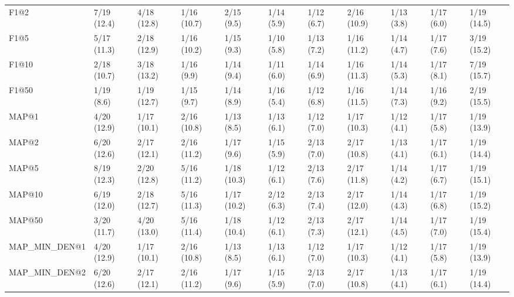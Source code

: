 \begin{tabular}{lllllllllll}
F1@2                        &    7/19 (12.4) &    4/18 (12.8) &     1/16 (10.7) &       2/15 (9.5) &  1/14 (5.9) &  1/12 (6.7) &  2/16 (10.9) &     1/13 (3.8) &            1/17 (6.0) &        1/19 (14.5) \\
F1@5                        &    5/17 (11.3) &    2/18 (12.9) &     1/16 (10.2) &       1/15 (9.3) &  1/10 (5.8) &  1/13 (7.2) &  1/16 (11.2) &     1/14 (4.7) &            1/17 (7.6) &        3/19 (15.2) \\
F1@10                       &    2/18 (10.7) &    3/18 (13.2) &      1/16 (9.9) &       1/14 (9.4) &  1/11 (6.0) &  1/14 (6.9) &  1/16 (11.3) &     1/14 (5.3) &            1/17 (8.1) &        7/19 (15.7) \\
F1@50                       &     1/19 (8.6) &    1/19 (12.7) &      1/15 (9.7) &       1/14 (8.9) &  1/16 (5.4) &  1/12 (6.8) &  1/16 (11.5) &     1/14 (7.3) &            1/16 (9.2) &        2/19 (15.5) \\
MAP@1                       &    4/20 (12.9) &    1/17 (10.1) &     2/16 (10.8) &       1/13 (8.5) &  1/13 (6.1) &  1/12 (7.0) &  1/17 (10.3) &     1/12 (4.1) &            1/17 (5.8) &        1/19 (13.9) \\
MAP@2                       &    6/20 (12.6) &    2/17 (12.1) &     2/16 (11.2) &       1/17 (9.6) &  1/15 (5.9) &  2/13 (7.0) &  2/17 (10.8) &     1/13 (4.1) &            1/17 (6.1) &        1/19 (14.4) \\
MAP@5                       &    8/19 (12.3) &    2/20 (12.8) &     5/16 (11.2) &      1/18 (10.3) &  1/12 (6.1) &  2/13 (7.6) &  2/17 (11.8) &     1/14 (4.2) &            1/17 (6.7) &        1/19 (15.1) \\
MAP@10                      &    6/19 (12.0) &    2/18 (12.7) &     5/16 (11.3) &      1/17 (10.2) &  2/12 (6.3) &  2/13 (7.4) &  2/17 (12.0) &     1/14 (4.3) &            1/17 (6.8) &        1/19 (15.2) \\
MAP@50                      &    3/20 (11.7) &    4/20 (13.0) &     5/16 (11.4) &      1/18 (10.4) &  1/12 (6.1) &  2/13 (7.3) &  2/17 (12.1) &     1/14 (4.5) &            1/17 (7.0) &        1/19 (15.4) \\
MAP_MIN_DEN@1               &    4/20 (12.9) &    1/17 (10.1) &     2/16 (10.8) &       1/13 (8.5) &  1/13 (6.1) &  1/12 (7.0) &  1/17 (10.3) &     1/12 (4.1) &            1/17 (5.8) &        1/19 (13.9) \\
MAP_MIN_DEN@2               &    6/20 (12.6) &    2/17 (12.1) &     2/16 (11.2) &       1/17 (9.6) &  1/15 (5.9) &  2/13 (7.0) &  2/17 (10.8) &     1/13 (4.1) &            1/17 (6.1) &        1/19 (14.4) \\

\end{tabular}
